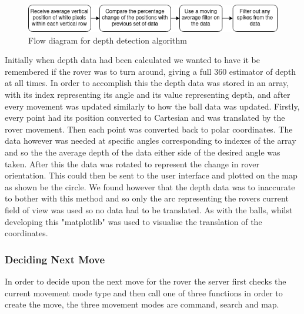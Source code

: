 \documentclass[10pt,twoside]{article}
\begin{document}
\begin{figure}[hbt]
    \centering
    \includegraphics[scale = 0.6]{CommandDepthFlow.png}
    \caption{Flow diagram for depth detection algorithm}
    \label{fig:CommandDepthFlow}
\end{figure}

Initially when depth data had been calculated we wanted to have it be remembered if the rover was to turn around, giving a full 360 estimator of depth at all times. In order to accomplish this the depth data was stored in an array, with its index representing its angle and its value representing depth, and after every movement was updated similarly to how the ball data was updated. Firstly, every point had its position converted to Cartesian and was translated by the rover movement. Then each point was converted back to polar coordinates. The data however was needed at specific angles corresponding to indexes of the array and so the the average depth of the data either side of the desired angle was taken. After this the data was rotated to represent the change in rover orientation. This could then be sent to the user interface and plotted on the map as shown be the circle. We found however that the depth data was to inaccurate to bother with this method and so only the arc representing the rovers current field of view was used so no data had to be translated. As with the balls, whilst developing this "matplotlib" was used to visualise the translation of the coordinates.

\subsubsection{Deciding Next Move}
In order to decide upon the next move for the rover the server first checks the current movement mode type and then call one of three functions in order to create the move, the three movement modes are command, search and map.
\end{document}
